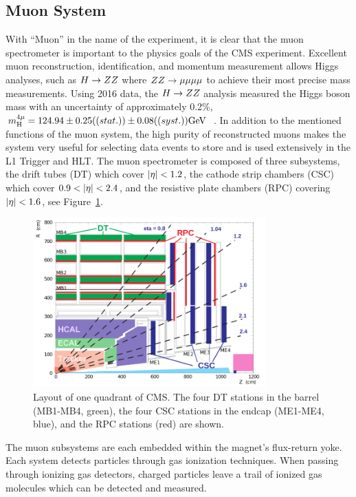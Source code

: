 \subsection{Muon System}
With ``Muon'' in the name of the experiment, it is clear that the muon spectrometer
is important to the physics goals of the CMS experiment. Excellent muon reconstruction, 
identification, and momentum measurement allows Higgs analyses, such as $H \to ZZ$
where $ZZ \to \mu\mu\mu\mu$ to achieve their most precise mass measurements. Using
2016 data, the $H \to ZZ$ analysis measured the Higgs boson mass with an uncertainty
of approximately 0.2\%, 
$m^{4\mu}_{\textrm{H}} = 124.94 \pm 0.25 ((stat.)) \pm 0.08 ((syst.)) \mathrm{GeV}$~\cite{cms-2016-hzz}.
In addition to the mentioned functions of the muon system, the high purity of reconstructed
muons makes the system very useful for selecting data events to store and is used extensively
in the L1 Trigger and HLT.
The muon spectrometer is composed of three subsystems, the drift tubes (DT) which cover
$\lvert\eta\rvert < 1.2$, the cathode strip chambers (CSC) which cover $0.9 < \lvert\eta\rvert < 2.4$, and
the resistive plate chambers (RPC) covering $\lvert\eta\rvert < 1.6$, see Figure~\ref{fig:cms_muon_syst}.

\begin{figure}[htbp]
\centering
     \includegraphics[width=0.8\textwidth]{cms_and_lhc/plots/cms_muon_syst.png}
     \caption{
Layout of one quadrant of CMS. The four DT stations in the barrel (MB1-MB4, green), the four CSC stations in the endcap (ME1-ME4, blue), and the RPC stations (red) are shown.
     }
     \label{fig:cms_muon_syst}
\end{figure}

The muon subsystems are each embedded within the magnet's flux-return yoke. Each system
detects particles through gas ionization techniques. 
When passing through ionizing gas detectors, charged particles leave a trail of ionized gas 
molecules which can be detected and measured.

